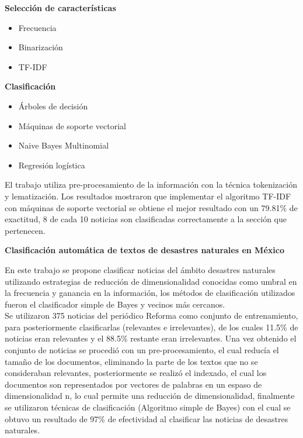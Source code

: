 \textbf{Selección de características}

\begin{itemize}
	
	\item Frecuencia
	\item Binarización
	\item TF-IDF
\end{itemize}

\textbf{Clasificación}

\begin{itemize}
	\item Árboles de decisión
	\item Máquinas de soporte vectorial
	\item Naive Bayes Multinomial
	\item Regresión logística
\end{itemize}

El trabajo utiliza  pre-procesamiento de la información con la técnica tokenización y lematización. Los resultados mostraron que implementar el algoritmo TF-IDF con máquinas de soporte vectorial se obtiene el mejor resultado con un 79.81\% de exactitud, 8 de cada 10 noticias son clasificadas correctamente a la sección que pertenecen.\\

\begin{large}
	 \textbf{Clasificación automática de textos de desastres naturales en México}\\
\end{large}

En este trabajo se propone clasificar noticias del ámbito desastres naturales utilizando estrategias de reducción de dimensionalidad conocidas como umbral en la frecuencia y ganancia en la información, los métodos de clasificación utilizados fueron el clasificador simple de Bayes y vecinos más cercanos.\\

Se utilizaron 375 noticias del periódico Reforma como conjunto de entrenamiento, para posteriormente clasificarlas (relevantes e irrelevantes), de los cuales 11.5\% de noticias eran relevantes y el 88.5\% restante eran irrelevantes. Una vez obtenido el conjunto de noticias se procedió con un pre-procesamiento, el cual reducía el tamaño de los documentos, eliminando la parte de los textos que no se consideraban relevantes, posteriormente se realizó el indexado, el cual los documentos son representados por vectores de palabras en un espaso de dimensionalidad n, lo cual permite una reducción de dimensionalidad, finalmente se utilizaron técnicas de clasificación (Algoritmo simple de Bayes) con el cual se obtuvo un resultado de 97\% de efectividad al clasificar las noticias de desastres naturales\cite{cuatro}.\\

